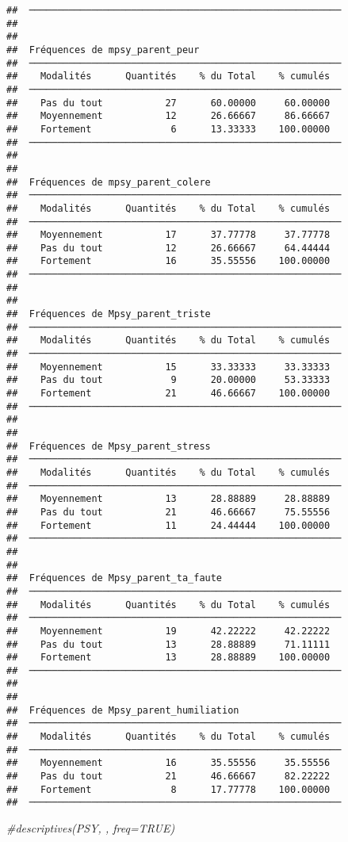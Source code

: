 \documentclass[
]{article}
\newenvironment{Shaded}{\begin{snugshade}}{\end{snugshade}}
\newcommand{\CommentTok}[1]{\textcolor[rgb]{0.56,0.35,0.01}{\textit{#1}}}
\begin{document}
\begin{verbatim}
##  ─────────────────────────────────────────────────────── 
## 
## 
##  Fréquences de mpsy_parent_peur                          
##  ─────────────────────────────────────────────────────── 
##    Modalités      Quantités    % du Total    % cumulés   
##  ─────────────────────────────────────────────────────── 
##    Pas du tout           27      60.00000     60.00000   
##    Moyennement           12      26.66667     86.66667   
##    Fortement              6      13.33333    100.00000   
##  ─────────────────────────────────────────────────────── 
## 
## 
##  Fréquences de mpsy_parent_colere                        
##  ─────────────────────────────────────────────────────── 
##    Modalités      Quantités    % du Total    % cumulés   
##  ─────────────────────────────────────────────────────── 
##    Moyennement           17      37.77778     37.77778   
##    Pas du tout           12      26.66667     64.44444   
##    Fortement             16      35.55556    100.00000   
##  ─────────────────────────────────────────────────────── 
## 
## 
##  Fréquences de Mpsy_parent_triste                        
##  ─────────────────────────────────────────────────────── 
##    Modalités      Quantités    % du Total    % cumulés   
##  ─────────────────────────────────────────────────────── 
##    Moyennement           15      33.33333     33.33333   
##    Pas du tout            9      20.00000     53.33333   
##    Fortement             21      46.66667    100.00000   
##  ─────────────────────────────────────────────────────── 
## 
## 
##  Fréquences de Mpsy_parent_stress                        
##  ─────────────────────────────────────────────────────── 
##    Modalités      Quantités    % du Total    % cumulés   
##  ─────────────────────────────────────────────────────── 
##    Moyennement           13      28.88889     28.88889   
##    Pas du tout           21      46.66667     75.55556   
##    Fortement             11      24.44444    100.00000   
##  ─────────────────────────────────────────────────────── 
## 
## 
##  Fréquences de Mpsy_parent_ta_faute                      
##  ─────────────────────────────────────────────────────── 
##    Modalités      Quantités    % du Total    % cumulés   
##  ─────────────────────────────────────────────────────── 
##    Moyennement           19      42.22222     42.22222   
##    Pas du tout           13      28.88889     71.11111   
##    Fortement             13      28.88889    100.00000   
##  ─────────────────────────────────────────────────────── 
## 
## 
##  Fréquences de Mpsy_parent_humiliation                   
##  ─────────────────────────────────────────────────────── 
##    Modalités      Quantités    % du Total    % cumulés   
##  ─────────────────────────────────────────────────────── 
##    Moyennement           16      35.55556     35.55556   
##    Pas du tout           21      46.66667     82.22222   
##    Fortement              8      17.77778    100.00000   
##  ───────────────────────────────────────────────────────
\end{verbatim}

\begin{Shaded}
\begin{Highlighting}[]
\CommentTok{\#descriptives(PSY, , freq=TRUE)}
\end{Highlighting}
\end{Shaded}
\end{document}
